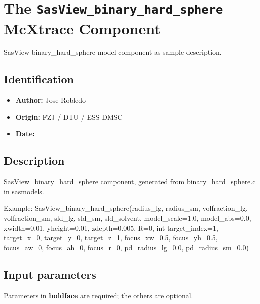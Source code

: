 \section{The \texttt{SasView\_binary\_hard\_sphere} McXtrace Component}
SasView binary\_hard\_sphere model component as sample description.

\subsection*{Identification}
\begin{itemize}
  \item \textbf{Author:} Jose Robledo
  \item \textbf{Origin:} FZJ / DTU / ESS DMSC
  \item \textbf{Date:} 
\end{itemize}

\subsection*{Description}
SasView\_binary\_hard\_sphere component, generated from binary\_hard\_sphere.c in sasmodels.

Example: SasView\_binary\_hard\_sphere(radius\_lg, radius\_sm, volfraction\_lg, volfraction\_sm, sld\_lg, sld\_sm, sld\_solvent, model\_scale=1.0, model\_abs=0.0, xwidth=0.01, yheight=0.01, zdepth=0.005, R=0, int target\_index=1, target\_x=0, target\_y=0, target\_z=1, focus\_xw=0.5, focus\_yh=0.5, focus\_aw=0, focus\_ah=0, focus\_r=0, pd\_radius\_lg=0.0, pd\_radius\_sm=0.0)

\subsection*{Input parameters}
Parameters in \textbf{boldface} are required; the others are optional.

